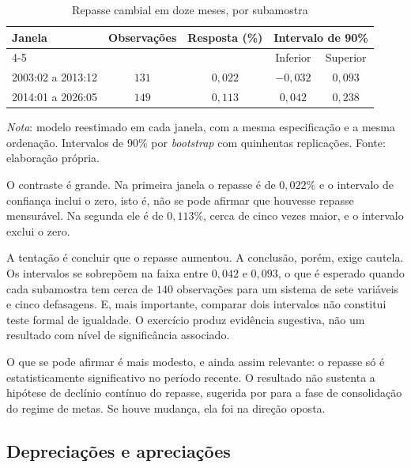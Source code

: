 \documentclass[12pt,openright,oneside,a4paper,portuguese,brazil]{abntex2}
\begin{document}
\begin{table}[htbp]
\centering
\caption{Repasse cambial em doze meses, por subamostra}
\label{tab:subamostras}
\footnotesize
\begin{tabular}{lcccc}
\toprule
Janela & Observações & Resposta (\%) & \multicolumn{2}{c}{Intervalo de 90\%} \\
\cmidrule(lr){4-5}
       &             &               & Inferior & Superior \\
\midrule
2003:02 a 2013:12 & $131$ & $0{,}022$ & $-0{,}032$ & $0{,}093$ \\
2014:01 a 2026:05 & $149$ & $0{,}113$ & $0{,}042$  & $0{,}238$ \\
\bottomrule
\end{tabular}

\vspace{2pt}
\begin{flushleft}\footnotesize
\textit{Nota}: modelo reestimado em cada janela, com a mesma especificação e a
mesma ordenação. Intervalos de 90\% por \textit{bootstrap} com quinhentas
replicações. Fonte: elaboração própria.
\end{flushleft}
\end{table}

O contraste é grande. Na primeira janela o repasse é de $0{,}022\%$ e o
intervalo de confiança inclui o zero, isto é, não se pode afirmar que houvesse
repasse mensurável. Na segunda ele é de $0{,}113\%$, cerca de cinco vezes
maior, e o intervalo exclui o zero.

A tentação é concluir que o repasse aumentou. A conclusão, porém, exige cautela. Os intervalos se sobrepõem na faixa entre
$0{,}042$ e $0{,}093$, o que é esperado quando cada subamostra tem cerca de
$140$ observações para um sistema de sete variáveis e cinco defasagens. E,
mais importante, comparar dois intervalos não constitui teste formal de
igualdade. O exercício produz evidência sugestiva,
não um resultado com nível de significância associado.

O que se pode afirmar é mais modesto, e ainda assim relevante: o repasse só é
estatisticamente significativo no período recente. O resultado não sustenta a
hipótese de declínio contínuo do repasse, sugerida por
 para a fase de consolidação do regime de metas. Se
houve mudança, ela foi na direção oposta.

\subsection{Depreciações e apreciações}
\end{document}
